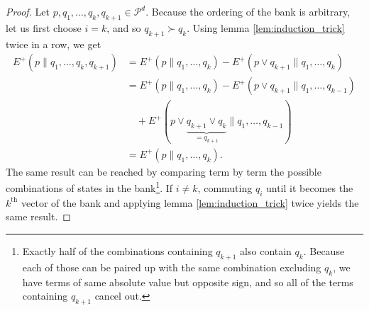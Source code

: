 \begin{proof}
    Let $p, q_1, \dots, q_k, q_{k+1} \in \mathcal{P}^d$.  Because the ordering of the bank is arbitrary, let us first choose $i = k$, and so $q_{k+1} \succ q_k$. Using lemma \ref{lem:induction_trick} twice in a row, we get
    \begin{align}
        E^+(p \parallel q_1, \dots, q_k, q_{k+1}) &= E^+(p \parallel q_1, \dots, q_k) - E^+(p \vee q_{k+1} \parallel q_1, \dots, q_k)\\
                                                  &= E^+(p \parallel q_1, \dots, q_k) - E^+(p \vee q_{k+1} \parallel q_1, \dots, q_{k-1})\nonumber\\
                                                  &\quad + E^+(p \vee \underbrace{q_{k+1} \vee q_k}_{= q_{k+1}} \parallel q_1, \dots, q_{k-1})\\
                                                  &= E^+(p \parallel q_1, \dots, q_k).
    \end{align}
    The same result can be reached by comparing term by term the possible combinations of states in the bank\footnote{Exactly half of the combinations containing $q_{k+1}$ also contain $q_k$. Because each of those can be paired up with the same combination excluding $q_k$, we have terms of same absolute value but opposite sign, and so all of the terms containing $q_{k+1}$ cancel out.}. If $i \neq k$, commuting $q_i$ until it becomes the $k^\text{th}$ vector of the bank and applying lemma \ref{lem:induction_trick} twice yields the same result. 
\end{proof}